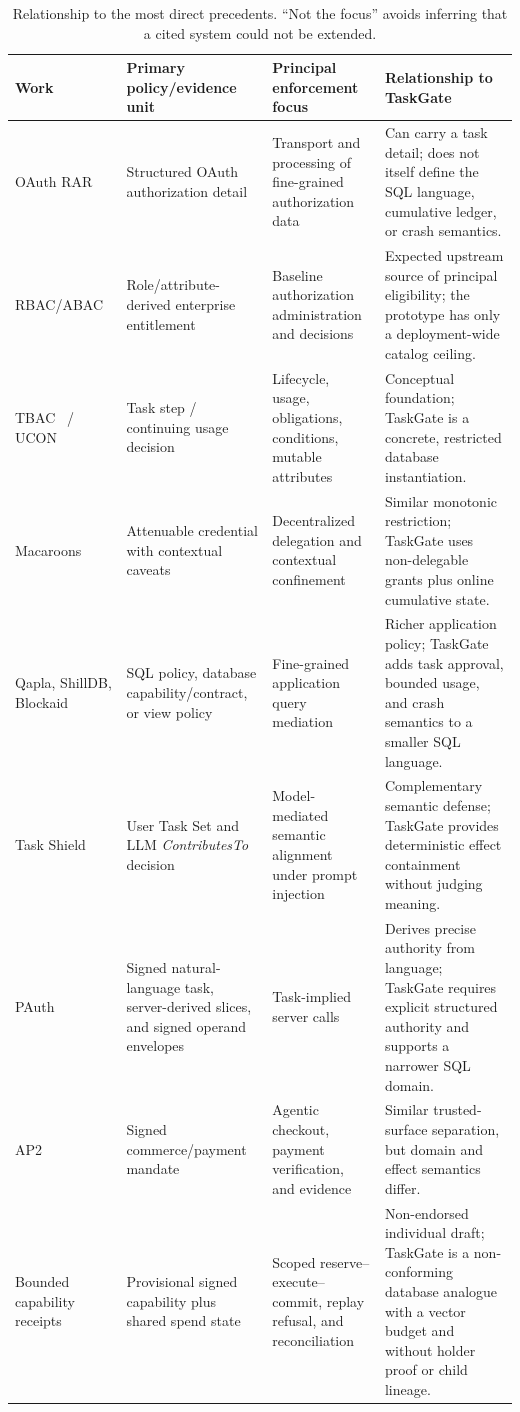 \documentclass[10pt,journal,compsoc]{IEEEtran}
\newcommand{\system}{TaskGate\xspace}
\begin{document}
\begin{table}[t]
\centering
\caption{Relationship to the most direct precedents. ``Not the focus'' avoids
inferring that a cited system could not be extended.}
\label{tab:related}
\footnotesize
\setlength{\tabcolsep}{4pt}
\begin{tabular}{L{0.14\textwidth}L{0.20\textwidth}L{0.25\textwidth}L{0.31\textwidth}}
\toprule
Work & Primary policy/evidence unit & Principal enforcement focus & Relationship to \system \\
\midrule
OAuth RAR~\cite{rfc9396} & Structured OAuth authorization detail & Transport and processing of fine-grained authorization data & Can carry a task detail; does not itself define the SQL language, cumulative ledger, or crash semantics. \\
RBAC/ABAC~\cite{ferraiolo2001rbac,hu2019abac} & Role/attribute-derived enterprise entitlement & Baseline authorization administration and decisions & Expected upstream source of principal eligibility; the prototype has only a deployment-wide catalog ceiling. \\
TBAC~\cite{thomas1998tbac} / UCON~\cite{park2004ucon} & Task step / continuing usage decision & Lifecycle, usage, obligations, conditions, mutable attributes & Conceptual foundation; \system is a concrete, restricted database instantiation. \\
Macaroons~\cite{birgisson2014macaroons} & Attenuable credential with contextual caveats & Decentralized delegation and contextual confinement & Similar monotonic restriction; \system uses non-delegable grants plus online cumulative state. \\
Qapla, ShillDB, Blockaid~\cite{mehta2017qapla,zigmond2020shilldb,zhang2022blockaid} & SQL policy, database capability/contract, or view policy & Fine-grained application query mediation & Richer application policy; \system adds task approval, bounded usage, and crash semantics to a smaller SQL language. \\
Task Shield~\cite{jia2025taskshield} & User Task Set and LLM \emph{ContributesTo} decision & Model-mediated semantic alignment under prompt injection & Complementary semantic defense; \system provides deterministic effect containment without judging meaning. \\
PAuth~\cite{sharma2026pauth} & Signed natural-language task, server-derived slices, and signed operand envelopes & Task-implied server calls & Derives precise authority from language; \system requires explicit structured authority and supports a narrower SQL domain. \\
AP2~\cite{ap2v02} & Signed commerce/payment mandate & Agentic checkout, payment verification, and evidence & Similar trusted-surface separation, but domain and effect semantics differ. \\
Bounded capability receipts~\cite{schrock2026bounded} & Provisional signed capability plus shared spend state & Scoped reserve--execute--commit, replay refusal, and reconciliation & Non-endorsed individual draft; \system is a non-conforming database analogue with a vector budget and without holder proof or child lineage. \\
\bottomrule
\end{tabular}
\end{table}
\end{document}
